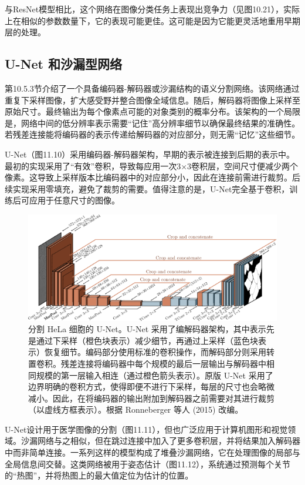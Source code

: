 与ResNet模型相比，这个网络在图像分类任务上表现出竞争力（见图10.21），实际上在相似的参数数量下，它的表现可能更佳。这可能是因为它能更灵活地重用早期层的处理。

\subsection{U-Net 和沙漏型网络}
第10.5.3节介绍了一个具备编码器-解码器或沙漏结构的语义分割网络。该网络通过重复下采样图像，扩大感受野并整合图像全域信息。随后，解码器将图像上采样至原始尺寸。最终输出为每个像素点可能的对象类别的概率分布。该架构的一个局限是，网络中间的低分辨率表示需要“记住”高分辨率细节以确保最终结果的准确性。若残差连接能将编码器的表示传递给解码器的对应部分，则无需“记忆”这些细节。

U-Net（图11.10）采用编码器-解码器架构，早期的表示被连接到后期的表示中。最初的实现采用了“有效”卷积，导致每应用一次3×3卷积层，空间尺寸便减少两个像素。这导致上采样版本比编码器中的对应部分小，因此在连接前需进行裁剪。后续实现采用零填充，避免了裁剪的需要。值得注意的是，U-Net完全基于卷积，训练后可应用于任意尺寸的图像。

\begin{figure}[ht!]
\centering
\includegraphics[width=0.7\linewidth]{png/chapter11/ResidualUNet.png}
\caption{分割 HeLa 细胞的 U-Net。U-Net 采用了编解码器架构，其中表示先是通过下采样（橙色块表示）减少细节，再通过上采样（蓝色块表示）恢复细节。编码部分使用标准的卷积操作，而解码部分则采用转置卷积。残差连接将编码器中每个规模的最后一层输出与解码器中相同规模的第一层输入相连（通过橙色箭头表示）。原版 U-Net 采用了边界明确的卷积方式，使得即便不进行下采样，每层的尺寸也会略微减小。因此，在将编码器的输出附加到解码器之前需要对其进行裁剪（以虚线方框表示）。根据 Ronneberger 等人 (2015) 改编。}
\end{figure}


U-Net设计用于医学图像的分割（图11.11），但也广泛应用于计算机图形和视觉领域。沙漏网络与之相似，但在跳过连接中加入了更多卷积层，并将结果加入解码器中而非简单连接。一系列这样的模型构成了堆叠沙漏网络，它在处理图像的局部与全局信息间交替。这类网络被用于姿态估计（图11.12），系统通过预测每个关节的“热图”，并将热图上的最大值定位为估计的位置。

